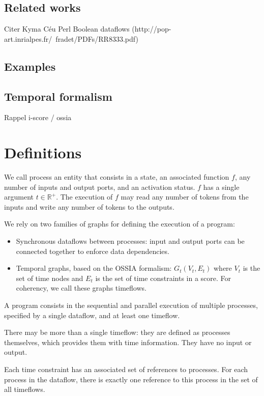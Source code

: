 \documentclass{article}
\begin{document}
    \subsection{Related works}
    Citer Kyma
    Céu
    Perl
    Boolean dataflows (http://pop-art.inrialpes.fr/~fradet/PDFs/RR8333.pdf)
    
    \subsection{Examples}
    
    \subsection{Temporal formalism}
    Rappel i-score / ossia
    
    
    \section{Definitions}
    We call process an entity that consists in a state, an associated function $f$, any number of inputs and output ports, and an activation status.
    $f$ has a single argument $t \in \mathbb{R^+}$.
    The execution of $f$ may read any number of tokens from the inputs and write any number of tokens to the outputs.
    
    We rely on two families of graphs for defining the execution of a program:
    
    \begin{itemize}
        \item Synchronous dataflows between processes: input and output ports can be connected together to enforce data dependencies.
        \item Temporal graphs, based on the OSSIA formalism: $G_t(V_t, E_t)$ where $V_t$ is the set of time nodes and $E_t$ is the set of time constraints in a score. 
        For coherency, we call these graphs timeflows.
    \end{itemize}

    A program consists in the sequential and parallel execution of multiple processes, specified by a single dataflow, and at least one timeflow.
    
    There may be more than a single timeflow: they are defined as processes themselves, which provides them with time information.
    They have no input or output.
    
    Each time constraint has an associated set of references to processes.
    For each process in the dataflow, there is exactly one reference to this process in the set of all timeflows.
    
\end{document}
